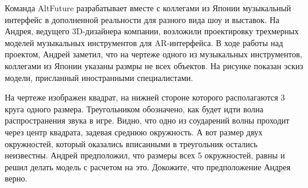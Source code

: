 
Команда AltFuture разрабатывает вместе с коллегами из Японии музыкальный интерфейс в дополненной реальности для разного вида шоу и выставок. На Андрея, ведущего 3D-дизайнера компании, возложили проектировку трехмерных моделей музыкальных инструментов для AR-интерфейса. В ходе работы над проектом, Андрей заметил, что на чертеже одного из музыкальных инструментов,  коллегами из Японии указаны размры не всех объектов. На рисунке показан эскиз модели, присланный иностранными специалистами.


На чертеже изображен квадрат, на нижней стороне которого располагаются 3 круга одного размера. Треугольником обозначено, как будет идти волна распространения звука в игре. Видно, что одно из соударений волны проходит через центр квадрата, задевая среднюю окружность. А вот размер двух окружностей, который оказались вписанными в треугольник остались неизвестны. 
Андрей предположил, что размеры всех 5 окружностей, равны и решил делать модель с расчетом на это. Докожите, что предположение Андрея верно.